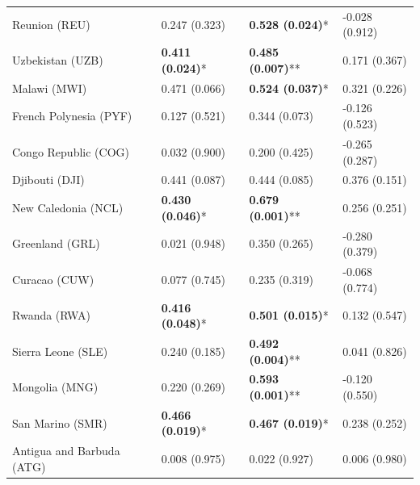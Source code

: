 \begin{longtable}{p{5cm}p{3cm}p{3cm}p{5cm}}
Reunion (REU) & \textcolor{atlOrange600}{0.247 (0.323)} & \textcolor{atlLime600}{\textbf{0.528 (0.024)}*} & \textcolor{atlOrange600}{-0.028 (0.912)} \\
Uzbekistan (UZB) & \textcolor{atlLime600}{\textbf{0.411 (0.024)}*} & \textcolor{atlLime600}{\textbf{0.485 (0.007)}**} & \textcolor{atlOrange600}{0.171 (0.367)} \\
Malawi (MWI) & \textcolor{atlOrange600}{0.471 (0.066)} & \textcolor{atlLime600}{\textbf{0.524 (0.037)}*} & \textcolor{atlOrange600}{0.321 (0.226)} \\
French Polynesia (PYF) & \textcolor{atlOrange600}{0.127 (0.521)} & \textcolor{atlOrange600}{0.344 (0.073)} & \textcolor{atlOrange600}{-0.126 (0.523)} \\
Congo Republic (COG) & \textcolor{atlOrange600}{0.032 (0.900)} & \textcolor{atlOrange600}{0.200 (0.425)} & \textcolor{atlOrange600}{-0.265 (0.287)} \\
Djibouti (DJI) & \textcolor{atlOrange600}{0.441 (0.087)} & \textcolor{atlOrange600}{0.444 (0.085)} & \textcolor{atlOrange600}{0.376 (0.151)} \\
New Caledonia (NCL) & \textcolor{atlLime600}{\textbf{0.430 (0.046)}*} & \textcolor{atlLime600}{\textbf{0.679 (0.001)}**} & \textcolor{atlOrange600}{0.256 (0.251)} \\
Greenland (GRL) & \textcolor{atlOrange600}{0.021 (0.948)} & \textcolor{atlOrange600}{0.350 (0.265)} & \textcolor{atlOrange600}{-0.280 (0.379)} \\
Curacao (CUW) & \textcolor{atlOrange600}{0.077 (0.745)} & \textcolor{atlOrange600}{0.235 (0.319)} & \textcolor{atlOrange600}{-0.068 (0.774)} \\
Rwanda (RWA) & \textcolor{atlLime600}{\textbf{0.416 (0.048)}*} & \textcolor{atlLime600}{\textbf{0.501 (0.015)}*} & \textcolor{atlOrange600}{0.132 (0.547)} \\
Sierra Leone (SLE) & \textcolor{atlOrange600}{0.240 (0.185)} & \textcolor{atlLime600}{\textbf{0.492 (0.004)}**} & \textcolor{atlOrange600}{0.041 (0.826)} \\
Mongolia (MNG) & \textcolor{atlOrange600}{0.220 (0.269)} & \textcolor{atlLime600}{\textbf{0.593 (0.001)}**} & \textcolor{atlOrange600}{-0.120 (0.550)} \\
San Marino (SMR) & \textcolor{atlLime600}{\textbf{0.466 (0.019)}*} & \textcolor{atlLime600}{\textbf{0.467 (0.019)}*} & \textcolor{atlOrange600}{0.238 (0.252)} \\
Antigua and Barbuda (ATG) & \textcolor{atlOrange600}{0.008 (0.975)} & \textcolor{atlOrange600}{0.022 (0.927)} & \textcolor{atlOrange600}{0.006 (0.980)} \\

\end{longtable}
